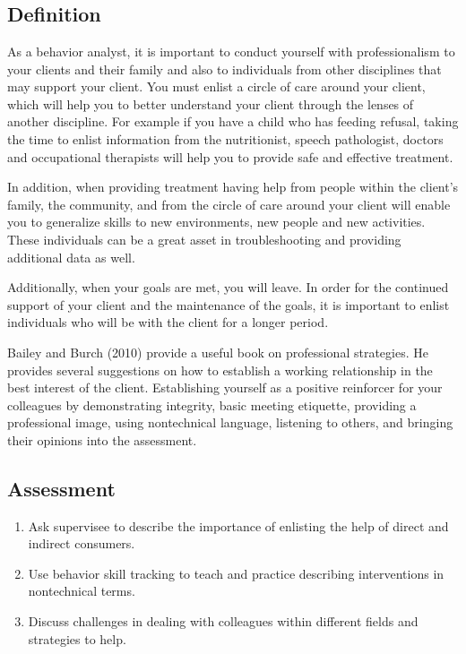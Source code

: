 \clearpage \section[\fourkEight{}]{\fourkEight{}%
              }
\subsection{Definition}
As a behavior analyst, it is important to conduct yourself with professionalism to your clients and their family and also to individuals from other disciplines that may support your client.  You must enlist a circle of care around your client, which will help you to better understand your client through the lenses of another discipline.  For example if you have a child who has feeding refusal, taking the time to enlist information from the nutritionist, speech pathologist, doctors and occupational therapists will help you to provide safe and effective treatment.

In addition, when providing treatment having help from people within the client's family, the community, and from the circle of care around your client will enable you to generalize skills to new environments, new people and new activities.  These individuals can be a great asset in troubleshooting and providing additional data as well.

Additionally, when your goals are met, you will leave.  In order for the continued support of your client and the maintenance of the goals, it is important to enlist individuals who will be with the client for a longer period.

Bailey and Burch (2010) provide a useful book on professional strategies. He provides several suggestions on how to establish a working relationship in the best interest of the client.  Establishing yourself as a positive reinforcer for your colleagues by demonstrating integrity, basic meeting etiquette, providing a professional image, using nontechnical language, listening to others, and bringing their opinions into the assessment. 
%
\subsection{Assessment}
\begin{enumerate}
\item Ask supervisee to describe the importance of enlisting the help of direct and indirect consumers.
\item Use behavior skill tracking to teach and practice describing interventions in nontechnical terms.
\item Discuss challenges in dealing with colleagues within different fields and strategies to help.
\end{enumerate}
%
